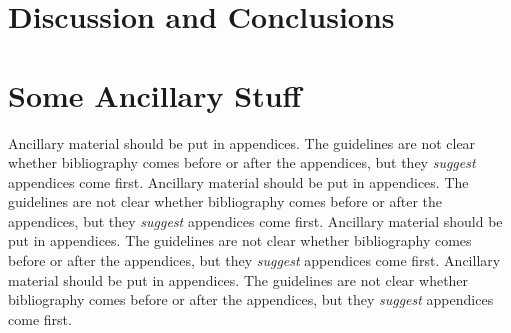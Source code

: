\documentclass[11pt]{ucscthesisbs}
\begin{document}
\chapter{Discussion and Conclusions}





\appendix
\chapter{Some Ancillary Stuff}

Ancillary material should be put in appendices.  The guidelines are not
clear whether bibliography comes before or after the appendices, but they
\emph{suggest} appendices come first.
Ancillary material should be put in appendices.  The guidelines are not
clear whether bibliography comes before or after the appendices, but they
\emph{suggest} appendices come first.
Ancillary material should be put in appendices.  The guidelines are not
clear whether bibliography comes before or after the appendices, but they
\emph{suggest} appendices come first.
Ancillary material should be put in appendices.  The guidelines are not
clear whether bibliography comes before or after the appendices, but they
\emph{suggest} appendices come first.




\end{document}
